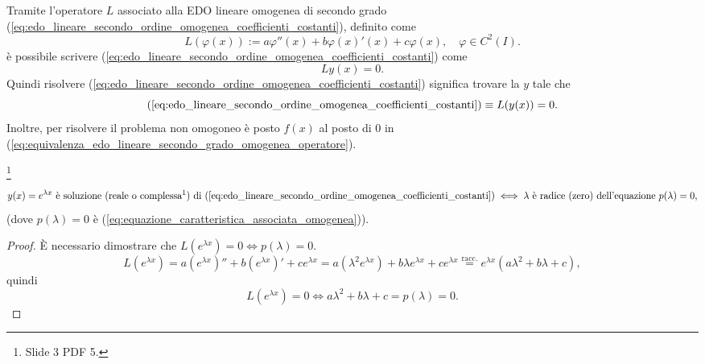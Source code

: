 \begin{remark}
	Tramite l'operatore $L$ associato alla EDO lineare omogenea di secondo grado (\ref{eq:edo_lineare_secondo_ordine_omogenea_coefficienti_costanti}), definito come 
	\begin{equation*}
		L(\varphi(x)):=a\varphi''(x) + b\varphi(x)'(x) + c\varphi(x),\quad \varphi\in C^2(I).
	\end{equation*}
	è possibile scrivere (\ref{eq:edo_lineare_secondo_ordine_omogenea_coefficienti_costanti}) come
	\begin{equation*}
		Ly(x)=0.
	\end{equation*}
	Quindi risolvere (\ref{eq:edo_lineare_secondo_ordine_omogenea_coefficienti_costanti}) significa trovare la $y$ tale che
	\begin{equation}\label{eq:equivalenza_edo_lineare_secondo_grado_omogenea_operatore}
		(\ref{eq:edo_lineare_secondo_ordine_omogenea_coefficienti_costanti})\equiv L(y(x)) = 0.
	\end{equation}
	Inoltre, per risolvere il problema non omogoneo è posto $f(x)$ al posto di 0 in (\ref{eq:equivalenza_edo_lineare_secondo_grado_omogenea_operatore}).
\end{remark}

\begin{proposition}\footnote{Slide 3 PDF 5.}\label{prop:e^lambdax_soluzione_omogenea_secondo_grado_lineare}
	\begin{equation*}
		y(x)=e^{\lambda x}\text{ è soluzione (reale o complessa\footnotemark) di (\ref{eq:edo_lineare_secondo_ordine_omogenea_coefficienti_costanti})} \iff \lambda \text{ è radice (zero) dell'equazione } p(\lambda)=0,
	\end{equation*}
	(dove $p(\lambda)=0$ è (\ref{eq:equazione_caratteristica_associata_omogenea})).
\end{proposition}
\begin{proof}
	È necessario dimostrare che $L(e^{\lambda x})=0\iff p(\lambda)=0$.
	\begin{equation*}
		L(e^{\lambda x}) = a(e^{\lambda x})''+ b(e^{\lambda x})'+ c e^{\lambda x} = a(\lambda^2 e^{\lambda x}) + b\lambda e^{\lambda x} + c e^{\lambda x} \overset{\text{racc.}}{=} e^{\lambda x} (a\lambda ^2 + b\lambda + c),
	\end{equation*}
	quindi
	\begin{equation*}
		L(e^{\lambda x}) = 0 \iff a\lambda^2 + b\lambda + c=p(\lambda) = 0.
	\end{equation*}
\end{proof}

